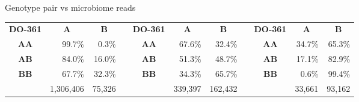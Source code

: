 \documentclass[aspectratio=169,12pt,t]{beamer}
\begin{document}
\begin{frame}{Genotype pair vs microbiome reads}
{{\begin{tabular}{c|r|r|cc|r|r|cc|r|r|}
        \multicolumn{1}{c}{\textbf{DO-361}}&
                 \multicolumn{1}{c}{\textbf{A}}&\multicolumn{1}{c}{\textbf{B}} &&
        \multicolumn{1}{c}{\textbf{DO-361}}&
                 \multicolumn{1}{c}{\textbf{A}}&\multicolumn{1}{c}{\textbf{B}} &&
        \multicolumn{1}{c}{\textbf{DO-361}}&
                 \multicolumn{1}{c}{\textbf{A}}&\multicolumn{1}{c}{\textbf{B}} \\
        \cline{2-3}\cline{6-7}\cline{10-11}
      \textbf{AA} & 99.7\% &  0.3\% &&
      \textbf{AA} & 67.6\% & 32.4\% &&
      \textbf{AA} & 34.7\% & 65.3\% \\
        \cline{2-3}\cline{6-7}\cline{10-11}

      \textbf{AB} & 84.0\%   & 16.0\%  &&
      \textbf{AB} & 51.3\%   & 48.7\%  &&
      \textbf{AB} & 17.1\%   & 82.9\%  \\
        \cline{2-3}\cline{6-7}\cline{10-11}

      \textbf{BB} & 67.7\% & 32.3\% &&
      \textbf{BB} & 34.3\% & 65.7\% &&
      \textbf{BB} &  0.6\% & 99.4\% \\
        \cline{2-3}\cline{6-7}\cline{10-11}

    \multicolumn{1}{c}{} & \multicolumn{1}{c}{\color{white} 1,306,406}
                & \multicolumn{1}{c}{\color{white} 75,326} &&
    \multicolumn{1}{c}{} & \multicolumn{1}{c}{\color{white} 339,397}
                & \multicolumn{1}{c}{\color{white} 162,432} &&
    \multicolumn{1}{c}{} & \multicolumn{1}{c}{\color{white} 33,661}
                & \multicolumn{1}{c}{\color{white} 93,162}
  \end{tabular} }
}


\note{
}

\end{frame}
\end{document}
